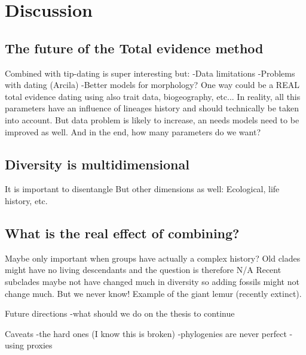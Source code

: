 \chapter{Discussion}
\label{chap:discussion}


\section{The future of the Total evidence method}
Combined with tip-dating is super interesting but:
-Data limitations
-Problems with dating (Arcila)
-Better models for morphology?
One way could be a REAL total evidence dating using also trait data, biogeography, etc...
In reality, all this parameters have an influence of lineages history and should technically be taken into account.
But data problem is likely to increase, an needs models need to be improved as well.
And in the end, how many parameters do we want?

\section{Diversity is multidimensional}
It is important to disentangle
But other dimensions as well: Ecological, life history, etc.

\section{What is the real effect of combining?}
Maybe only important when groups have actually a complex history?
Old clades might have no living descendants and the question is therefore N/A
Recent subclades maybe not have changed much in diversity so adding fossils might not change much.
But we never know! Example of the giant lemur (recently extinct).

Future directions
-what should we do on the thesis to continue

Caveats
-the hard ones (I know this is broken)
-phylogenies are never perfect
-using proxies